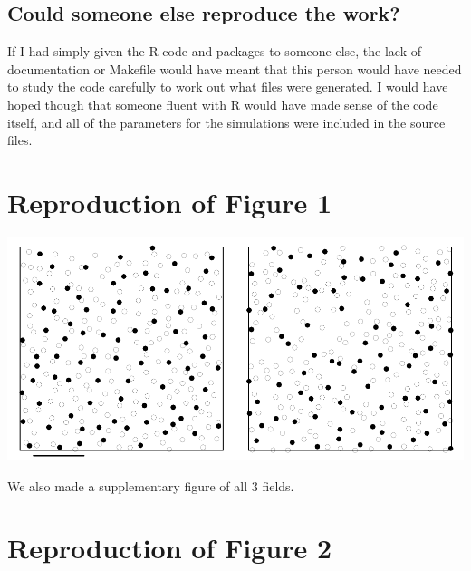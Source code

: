 \hypertarget{could-someone-else-reproduce-the-work}{%
\subsection{Could someone else reproduce the
work?}\label{could-someone-else-reproduce-the-work}}

If I had simply given the R code and packages to someone else, the lack
of documentation or Makefile would have meant that this person would
have needed to study the code carefully to work out what files were
generated. I would have hoped though that someone fluent with R would
have made sense of the code itself, and all of the parameters for the
simulations were included in the source files.

\hypertarget{reproduction-of-figure-1}{%
\section{Reproduction of Figure 1}\label{reproduction-of-figure-1}}

\includegraphics{hor_fieldA_col.pdf}

We also made a supplementary figure of all 3 fields.

\hypertarget{reproduction-of-figure-2}{%
\section{Reproduction of Figure 2}\label{reproduction-of-figure-2}}

